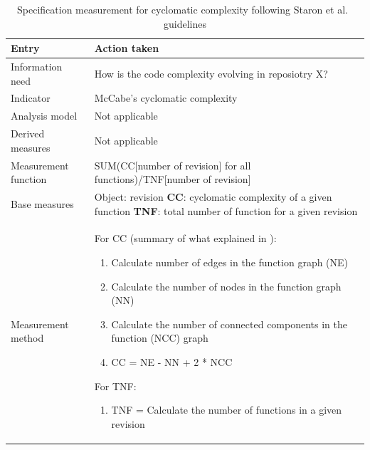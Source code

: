    \begin{table}[!htb]
		\centering
		\tabulinesep=1.2mm
		\begin{tabu} to \textwidth {|X|X[2]|}
			    
			\hline
			\textbf{Entry} & \textbf{Action taken} \\ 
			\hline
			
			Information need & How is the code complexity evolving in reposiotry X? \\
			\hline
			
			Indicator & McCabe's \cite{cyclomatic_complexity} cyclomatic complexity \\
			\hline
			
			Analysis model & Not applicable \\
			\hline
			
			Derived measures & Not applicable \\
			\hline
			
			Measurement function & SUM(CC[number of revision] for all functions)/TNF[number of revision] \\
			\hline
			
			Base measures & Object: revision \newline
			                    \textbf{CC}: cyclomatic complexity of a given function \newline
			                    \textbf{TNF}: total number of function for a given revision \\
		    \hline
			
			Measurement method & For CC (summary of what explained in \cite{cyclomatic_complexity}):
			    \begin{enumerate}
			    \item Calculate number of edges in the function graph (NE)
			    \item Calculate the number of nodes in the function graph (NN)
			    \item Calculate the number of connected components in the function (NCC) graph
			    \item CC = NE - NN + 2 * NCC 
			    \end{enumerate}
			
			For TNF:
			\begin{enumerate}
			\item TNF = Calculate the number of functions in a given revision
			\end{enumerate}
			
			\\
			\hline
				
		\end{tabu}
		\caption[Specification measurement for cyclomatic complexity]
        {Specification measurement for cyclomatic complexity following Staron et al.\ \cite{metrics_paper} guidelines}
        \label{tab:complexity_measurement_system}
    \end{table}
    
